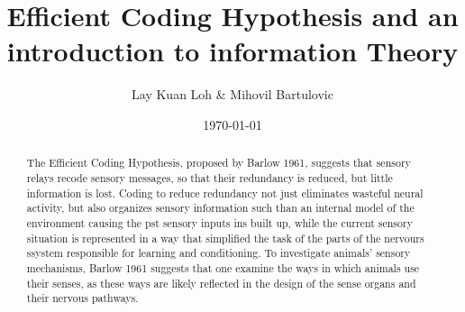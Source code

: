 \documentclass[twoside]{article}
\title{\vspace{-15mm}\fontsize{24pt}{10pt}\selectfont\textbf{Efficient Coding Hypothesis and an introduction to information Theory}} %
\author{Lay Kuan Loh \& Mihovil Bartulovic}
\date{\today}
\begin{document}
\maketitle %

\thispagestyle{fancy} %





\begin{abstract}

\noindent The Efficient Coding Hypothesis, proposed by Barlow 1961, suggests that sensory relays recode sensory messages, so that their redundancy is reduced, but little information is lost. Coding to reduce redundancy not just eliminates wasteful neural activity, but also organizes sensory information such than an internal model of the environment causing the pst sensory inputs ins built up, while the current sensory situation is represented in a way that simplified the task of the parts of the nervours ssystem responsible for learning and conditioning. To investigate animals' sensory mechanisms, Barlow 1961 suggests that one examine the ways in which animals use their senses, as these ways are likely reflected in the design of the sense organs and their nervous pathways.

\end{abstract}









\end{document}
